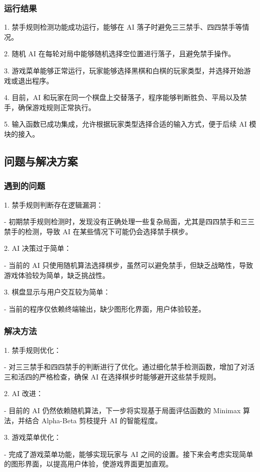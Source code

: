 \subsubsection{运行结果}
1. 禁手规则检测功能成功运行，能够在 AI 落子时避免三三禁手、四四禁手等情况。

2. 随机 AI 在每轮对局中能够随机选择空位置进行落子，且避免禁手操作。

3. 游戏菜单能够正常运行，玩家能够选择黑棋和白棋的玩家类型，并选择开始游戏或退出程序。

4. 目前，AI 和玩家在同一个棋盘上交替落子，程序能够判断胜负、平局以及禁手，确保游戏规则正常执行。

5. 输入函数已成功集成，允许根据玩家类型选择合适的输入方式，便于后续 AI 模块的接入。

\subsection{问题与解决方案} %

\subsubsection{遇到的问题}
1. 禁手规则判断存在逻辑漏洞：

   - 初期禁手规则检测时，发现没有正确处理一些复杂局面，尤其是四四禁手和三三禁手的检测，导致 AI 在某些情况下可能仍会选择禁手棋步。
   
2. AI 决策过于简单：

   - 当前的 AI 只使用随机算法选择棋步，虽然可以避免禁手，但缺乏战略性，导致游戏体验较为简单，缺乏挑战性。

3. 棋盘显示与用户交互较为简单：

   - 当前的程序仅依赖终端输出，缺少图形化界面，用户体验较差。

\subsubsection{解决方法}
1. 禁手规则优化：

   - 对三三禁手和四四禁手的判断进行了优化。通过细化禁手检测函数，增加了对活三和活四的严格检查，确保 AI 在选择棋步时能够避开这些禁手规则。
   
2. AI 改进：

   - 目前的 AI 仍然依赖随机算法，下一步将实现基于局面评估函数的 Minimax 算法，并结合 Alpha-Beta 剪枝提升 AI 的智能程度。

3. 游戏菜单优化：

   - 完成了游戏菜单功能，能够实现玩家与 AI 之间的设置。接下来会考虑实现简单的图形界面，以提高用户体验，使游戏界面更加直观。


